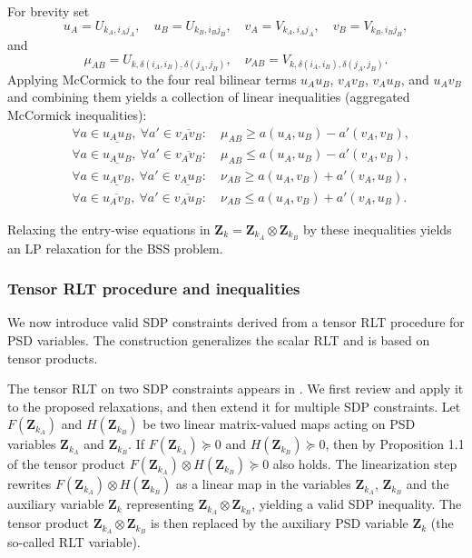 \documentclass[smallextended]{svjour3}
\newcommand{\Z}{\mathbf{Z}}
\newcommand{\1}{\mathbf{1}}
\DeclareMathOperator{\mtens}{\otimes}
\begin{document}
For brevity set
\[
u_A = U_{k_A,i_A j_A},\quad u_B = U_{k_B,i_B j_B},\quad
v_A = V_{k_A,i_A j_A},\quad v_B = V_{k_B,i_B j_B},
\]
and
\[
\mu_{AB} = U_{k,\delta(i_A,i_B),\delta(j_A,j_B)},\quad
\nu_{AB} = V_{k,\delta(i_A,i_B),\delta(j_A,j_B)}.
\]
Applying McCormick to the four real bilinear terms $u_A u_B$, $v_A v_B$, $v_A u_B$, and $u_A v_B$ and combining them yields a collection of linear inequalities (aggregated McCormick inequalities):
\begin{subequations}
\label{eq.mccons}
\begin{align}
&\forall a\in\underline{u_A u_B},\ \forall a'\in\overline{v_A v_B}:\quad
\mu_{AB} \ge a(u_A,u_B) - a'(v_A,v_B), \label{eq.mca}\\
&\forall a\in\underline{u_A u_B},\ \forall a'\in\overline{v_A v_B}:\quad
\mu_{AB} \le a(u_A,u_B) - a'(v_A,v_B),\\
&\forall a\in\underline{u_A v_B},\ \forall a'\in\underline{v_A u_B}:\quad
\nu_{AB} \ge a(u_A,v_B) + a'(v_A,u_B),\\
&\forall a\in\overline{u_A v_B},\ \forall a'\in\overline{v_A u_B}:\quad
\nu_{AB} \le a(u_A,v_B) + a'(v_A,u_B).
\end{align}
\end{subequations}

Relaxing the entry-wise equations in $\Z_k=\Z_{k_A}\mtens\Z_{k_B}$ by these inequalities yields an LP relaxation for the BSS problem.

\subsubsection{Tensor RLT procedure and inequalities}
\label{sec.rel4}
We now introduce valid SDP constraints derived from a tensor RLT procedure for PSD variables. The construction generalizes the scalar RLT and is based on tensor products.

The tensor RLT on two SDP constraints appears in \cite{anstreicher2017kronecker,sturm2003cones}. We first review and apply it to the proposed relaxations, and then extend it for multiple SDP constraints. Let $F(\Z_{k_A})$ and $H(\Z_{k_B})$ be two linear matrix-valued maps acting on PSD variables $\Z_{k_A}$ and $\Z_{k_B}$. If
$F(\Z_{k_A}) \succeq 0$ and $H(\Z_{k_B}) \succeq 0$, then by Proposition 1.1 of \cite{anstreicher2017kronecker} the tensor product
$F(\Z_{k_A}) \mtens H(\Z_{k_B}) \succeq 0$ also holds. The linearization step rewrites
$F(\Z_{k_A}) \mtens H(\Z_{k_B})$ as a linear map in the variables $\Z_{k_A}$, $\Z_{k_B}$ and the auxiliary variable $\Z_k$ representing $\Z_{k_A}\mtens\Z_{k_B}$, yielding a valid SDP inequality. The tensor product $\Z_{k_A}\mtens\Z_{k_B}$ is then replaced by the auxiliary PSD variable $\Z_k$ (the so-called RLT variable).
\end{document}
